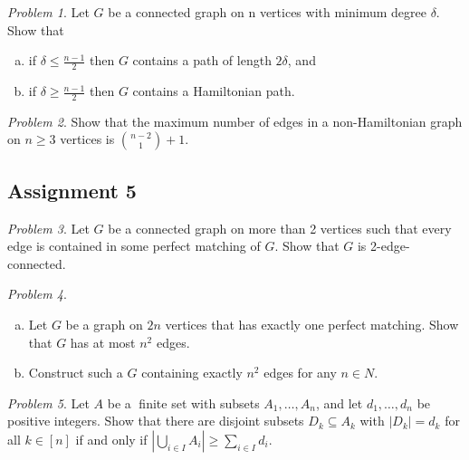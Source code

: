 \documentclass[10pt, fleqn, a4paper, landscape]{article}
\theoremstyle{plain} %
\theoremstyle{remark} %
\newtheorem{problem}{Problem}
\theoremstyle{definition} %
\begin{document}
\begin{multicols}{3}
\begin{tiny}
\begin{problem}
Let $G$ be a connected graph on n vertices with minimum degree $\delta$. Show that 
\begin{enumerate}[(a)]
\item if $\delta \le \frac{n-1}{2}$ then $G$ contains a path of length $2\delta$, and
\item if $\delta \ge \frac{n-1}{2}$ then $G$ contains a Hamiltonian path.
\end{enumerate}
\end{problem}

\begin{problem}
Show that the maximum number of edges in a non-Hamiltonian graph on $n \ge 3$
vertices is $\binom{n-2}{1}+1$.
\end{problem}

\subsection{Assignment 5}

\begin{problem}
Let $G$ be a connected graph on more than 2 vertices such that every edge is
contained in some perfect matching of $G$. Show that $G$ is 2-edge-connected.
\end{problem}

\begin{problem}
\begin{enumerate}[(a)]
\item Let $G$ be a graph on $2n$ vertices that has exactly one perfect matching. Show that $G$ has at most $n^2$ edges.
\item Construct such a $G$ containing exactly $n^2$ edges for any $n \in N$.
\end{enumerate}
\end{problem}

\begin{problem}
Let $A$ be a finite set with subsets $A_1,\dots, A_n$, and let $d_1,\dots, d_n$ be positive integers. Show that there are disjoint subsets $D_k \subseteq A_k$ with $|D_k| = d_k$ for all $k \in [n]$ if and
only if $|\bigcup_{i\in I}A_i|\ge \sum_{i\in I}d_i$.
\end{problem}


\end{tiny}
\end{multicols}
\end{document}
